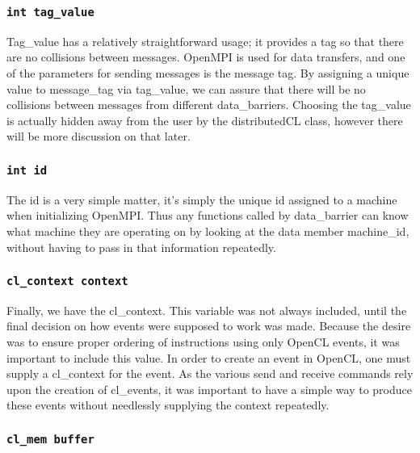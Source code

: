 \documentclass[thesis.tex]{subfiles}
\begin{document}

  \subsubsection{\texttt{int tag\_value}} %
  \label{ssub:int_tag_value}
    Tag\_value has a relatively straightforward usage; it provides a tag so that there are no collisions between messages. OpenMPI is used for data transfers, and one of the parameters for sending messages is the message tag. By assigning a unique value to message\_tag via tag\_value, we can assure that there will be no collisions between messages from different data\_barriers. Choosing the tag\_value is actually hidden away from the user by the distributedCL class, however there will be more discussion on that later.

  \subsubsection{\texttt{int id}} %
  \label{ssub:int_id}
    The id is a very simple matter, it's simply the unique id assigned to a machine when initializing OpenMPI. Thus any functions called by data\_barrier can know what machine they are operating on by looking at the data member machine\_id, without having to pass in that information repeatedly.

  \subsubsection{\texttt{cl\_context context}} %
  \label{ssub:cl_context_context}
    Finally, we have the cl\_context. This variable was not always included, until the final decision on how events were supposed to work was made. Because the desire was to ensure proper ordering of instructions using only OpenCL events, it was important to include this value. In order to create an event in OpenCL, one must supply a cl\_context for the event. As the various send and receive commands rely upon the creation of cl\_events, it was important to have a simple way to produce these events without needlessly supplying the context repeatedly.

  \subsubsection{\texttt{cl\_mem buffer}} %
  \label{ssub:cl_mem_buffer} 
\end{document}
